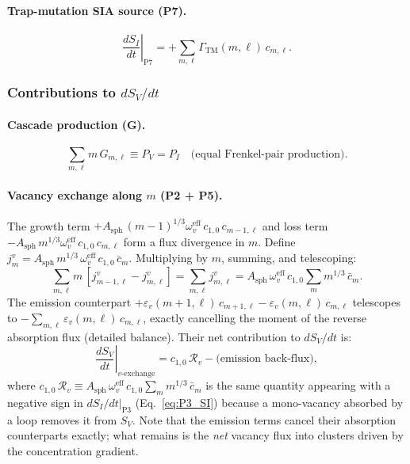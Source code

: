 \paragraph{Trap-mutation SIA source (P7).}
\begin{equation}\label{eq:P7_SI}
    \left.\frac{dS_I}{dt}\right|_{\mathrm{P7}}
    = +\sum_{m,\ell}\Gamma_{\mathrm{TM}}(m,\ell)\,c_{m,\ell}.
\end{equation}

\subsubsection*{Contributions to $dS_V/dt$}

\paragraph{Cascade production (G).}
\begin{equation}
    \sum_{m,\ell} m\,G_{m,\ell} \equiv P_V = P_I
    \quad \text{(equal Frenkel-pair production)}.
\end{equation}

\paragraph{Vacancy exchange along $m$ (P2 + P5).}
The growth term $+A_{\mathrm{sph}}\,(m{-}1)^{1/3}\omega_v^{\mathrm{eff}}\,
c_{1,0}\,c_{m-1,\ell}$ and loss term $-A_{\mathrm{sph}}\,m^{1/3}
\omega_v^{\mathrm{eff}}\,c_{1,0}\,c_{m,\ell}$ form a flux divergence in $m$.
Define $j_m^v = A_{\mathrm{sph}}\,m^{1/3}\,\omega_v^{\mathrm{eff}}\,c_{1,0}
\,\bar{c}_m$. Multiplying by $m$, summing, and telescoping:
\begin{equation}\label{eq:P2v_SV}
    \sum_{m,\ell} m\,[j_{m-1,\ell}^v - j_{m,\ell}^v]
    = \sum_{m,\ell} j_{m,\ell}^v
    = A_{\mathrm{sph}}\,\omega_v^{\mathrm{eff}}\,c_{1,0}
      \sum_m m^{1/3}\,\bar{c}_m.
\end{equation}
The emission counterpart $+\varepsilon_v(m{+}1,\ell)\,c_{m+1,\ell} -
\varepsilon_v(m,\ell)\,c_{m,\ell}$ telescopes to
$-\sum_{m,\ell}\varepsilon_v(m,\ell)\,c_{m,\ell}$, exactly cancelling the
moment of the reverse absorption flux (detailed balance). Their net
contribution to $dS_V/dt$ is:
\begin{equation}\label{eq:P2P5v_SV}
    \left.\frac{dS_V}{dt}\right|_{v\text{-exchange}}
    = c_{1,0}\,\mathcal{R}_v - \text{(emission back-flux)},
\end{equation}
where $c_{1,0}\,\mathcal{R}_v \equiv A_{\mathrm{sph}}\,\omega_v^{\mathrm{eff}}
\,c_{1,0}\sum_m m^{1/3}\,\bar{c}_m$ is the same quantity appearing with a
negative sign in $dS_I/dt|_{\mathrm{P3}}$ (Eq.~\ref{eq:P3_SI}) because a
mono-vacancy absorbed by a loop removes it from $S_V$. Note that the
emission terms cancel their absorption counterparts exactly; what remains is
the \emph{net} vacancy flux into clusters driven by the concentration gradient.

